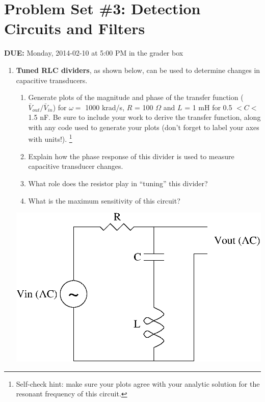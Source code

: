 


\section*{Problem Set \#3: Detection Circuits and Filters}

\textbf{DUE:} Monday, 2014-02-10 at 5:00 PM in the grader box

\begin{enumerate}
\item {\bf Tuned RLC dividers}, as shown below, can be used to determine changes in capacitive
transducers.  
\begin{enumerate}
\item Generate plots of the magnitude and phase of the transfer function
($\bar{V}_{out}/\bar{V}_{in}$) for $\omega =$ 1000 krad/s, $R$ = 100 $\Omega$
and $L$ = 1 mH for 0.5 $< C <$ 1.5 nF.  Be sure to include your work to derive
the transfer function, along with any code used to generate your plots (don't
forget to label your axes with units!).  \footnote{Self-check hint: make sure
your plots agree with your analytic solution for the resonant frequency of this
circuit.} 

\item Explain how the phase response of this divider is used to measure capacitive transducer changes. 

\item What role does the resistor play in ``tuning'' this divider? 

\item What is the maximum sensitivity of this circuit?

\end{enumerate}

\begin{center}
\includegraphics[scale=0.75]{tunedrlc.eps}
\end{center}


\end{enumerate}
